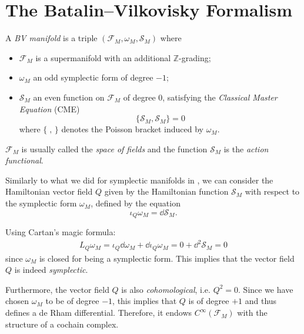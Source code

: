 \section{The Batalin–Vilkovisky Formalism}
\label{sec:BV_formalism}

\begin{definition}
\label{def:BV_manifold}
    A \emph{BV manifold} is a triple $(\mathcal{F}_M, \omega_M, \mathcal{S}_M)$ where
    \begin{itemize}
        \item $\mathcal{F}_M$ is a supermanifold with an additional $\mathbb{Z}$-grading;
        \item $\omega_M$ an odd symplectic form of degree $-1$;
        \item $\mathcal{S}_M$ an even function on $\mathcal{F}_M$ of degree $0$, satisfying the \emph{Classical Master Equation} (CME)
        \begin{equation}
            \{\mathcal{S}_M, \mathcal{S}_M\} = 0
        \end{equation}
        where $\{\;,\,\}$ denotes the Poisson bracket induced by $\omega_M$.
    \end{itemize}
\end{definition}

$\mathcal{F}_M$ is usually called the \emph{space of fields} and the function $\mathcal{S}_M$ is the \emph{action functional}.

Similarly to what we did for symplectic manifolds in , we can consider the Hamiltonian vector field $Q$ given by the Hamiltonian function $\mathcal{S}_M$ with respect to the symplectic form $\omega_M$, defined by the equation
\begin{equation*}
    \iota_Q \omega_M = \dd \mathcal{S}_M.
\end{equation*}

Using Cartan's magic formula:
\begin{align*}
    L_Q \omega_M = \iota_Q \dd \omega_M + \dd \iota_Q \omega_M =
    0 + \dd^2 \mathcal{S}_M = 0
\end{align*}
since $\omega_M$ is closed for being a symplectic form.
This implies that the vector field $Q$ is indeed \emph{symplectic}.

Furthermore, the vector field $Q$ is also \emph{cohomological}, i.e. $Q^2 = 0$.
Since we have chosen $\omega_M$ to be of degree $-1$, this implies that $Q$ is of degree $+1$ and thus defines a de Rham differential.
Therefore, it endows $C^\infty(\mathcal{F}_M)$ with the structure of a cochain complex.

